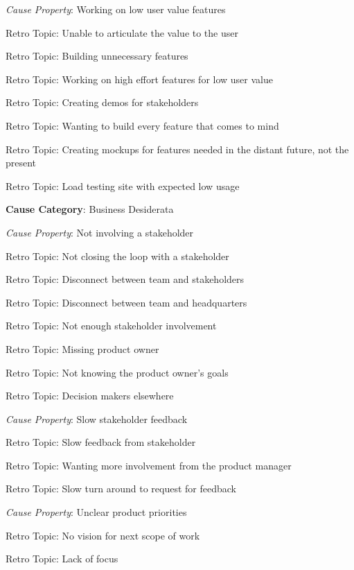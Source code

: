 \quad \quad \textit{Cause Property}: Working on low user value features

\quad \quad \quad Retro Topic: Unable to articulate the value to the user

\quad \quad \quad Retro Topic: Building unnecessary features

\quad \quad \quad Retro Topic: Working on high effort features for low user value

\quad \quad \quad Retro Topic: Creating demos for stakeholders

\quad \quad \quad Retro Topic: Wanting to build every feature that comes to mind

\quad \quad \quad Retro Topic: Creating mockups for features needed in the distant future, not the present

\quad \quad \quad Retro Topic: Load testing site with expected low usage

\quad \textbf{Cause Category}: Business Desiderata

\quad \quad \textit{Cause Property}: Not involving a stakeholder

\quad \quad \quad Retro Topic: Not closing the loop with a stakeholder

\quad \quad \quad Retro Topic: Disconnect between team and stakeholders

\quad \quad \quad Retro Topic: Disconnect between team and headquarters

\quad \quad \quad Retro Topic: Not enough stakeholder involvement

\quad \quad \quad Retro Topic: Missing product owner

\quad \quad \quad Retro Topic: Not knowing the product owner's goals

\quad \quad \quad Retro Topic: Decision makers elsewhere

\quad \quad \textit{Cause Property}: Slow stakeholder feedback

\quad \quad \quad Retro Topic: Slow feedback from stakeholder

\quad \quad \quad Retro Topic: Wanting more involvement from the product manager

\quad \quad \quad Retro Topic: Slow turn around to request for feedback

\quad \quad \textit{Cause Property}: Unclear product priorities

\quad \quad \quad Retro Topic: No vision for next scope of work

\quad \quad \quad Retro Topic: Lack of focus

